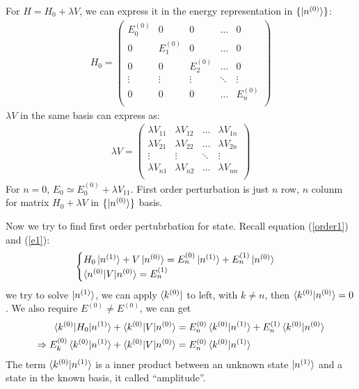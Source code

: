 \documentclass[UTF8,12pt]{article} %
\begin{document}
For $H=H_0+\lambda V$, we can express it in the energy representation in $\{\ket{n^{(0)}}\}$:
\begin{align}
H_0 = 
\begin{pmatrix}
     E^{(0)}_0& 0         & 0         & \ldots    & 0         \\
     0        & E^{(0)}_1 & 0         & \ldots    & 0         \\
     0        & 0         & E^{(0)}_2 & \ldots    & 0         \\
     \vdots   & \vdots    & \vdots    & \ddots    & \vdots    \\
     0        & 0         & 0         & \ldots    & E^{(0)}_n \\
\end{pmatrix}
\end{align}
$\lambda V$ in the same basis can express as:
\begin{align}
\lambda V = 
\begin{pmatrix}
    \lambda V_{11} & \lambda V_{12} & \ldots & \lambda V_{1n} \\
    \lambda V_{21} & \lambda V_{22} & \ldots & \lambda V_{2n} \\
    \vdots         & \vdots         & \ddots & \vdots         \\
    \lambda V_{n1} & \lambda V_{n2} & \ldots & \lambda V_{nn} \\
\end{pmatrix}
\end{align}
For $n=0$, $E_0\simeq E^{(0)}_0+\lambda V_{11}$. First order perturbation is just $n$ row, $n$ colunm for matrix $H_0+\lambda V$ in $\{\ket{n^{(0)}}\}$ basis.

Now we try to find first order pertubrbation for state. Recall equation (\ref{order1}) and (\ref{e1}):
\begin{align*}
\begin{cases}
H_0\ket{n^{(1)}}+V\ket{n^{(0)}} = E^{(0)}_n\ket{n^{(1)}}+E^{(1)}_n\ket{n^{(0)}} \\
\braket{n^{(0)}|V|n^{(0)}} = E^{(1)}_n
\end{cases}
\end{align*}
we try to solve $\ket{n^{(1)}}$, we can apply $\bra{k^{(0)}}$ to left, with $k\neq n$, then $\braket{k^{(0)}|n^{(0)}}=0$. We also require $E^{(0)} \neq E^{(0)}$, we can get 
\begin{align}
\braket{k^{(0)}|H_0|n^{(1)}}+\braket{k^{(0)}|V|n^{(0)}} &= E^{(0)}_n\braket{k^{(0)}|n^{(1)}}+E^{(1)}_n\braket{k^{(0)}|n^{(0)}} \\
\Rightarrow E^{(0)}_k\braket{ k^{(0)} | n^{(1)} }+\braket{k^{(0)}|V|n^{(0)}} &= E^{(0)}_n\braket{k^{(0)} | n^{(1)}}
\end{align}
The term $\braket{k^{(0)} | n^{(1)}}$ is a inner product between an unknown state $\ket{n^{(1)}}$ and a state in the known basis, it called ``amplitude''.
\end{document}
